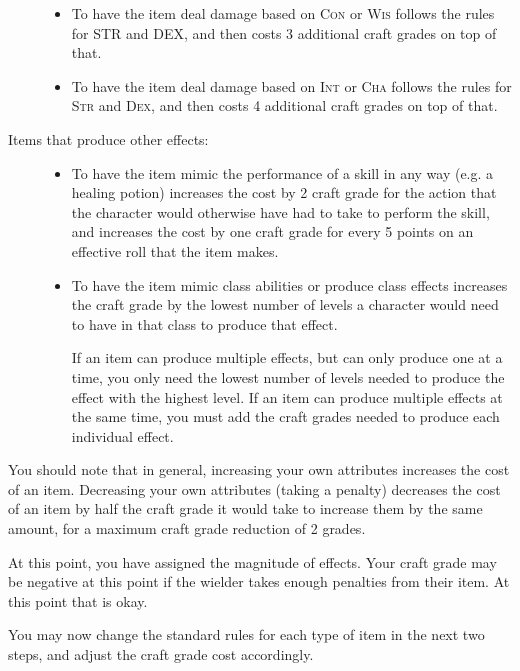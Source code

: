 \begin{description}
\begin{itemize}
		\item To have the item deal damage based on \textsc{Con} or \textsc{Wis} follows the rules for STR and DEX, and then costs 3 additional craft grades on top of that.
		
		\item To have the item deal damage based on \textsc{Int} or \textsc{Cha} follows the rules for \textsc{Str} and \textsc{Dex}, and then costs 4 additional craft grades on top of that.
	\end{itemize}
	\item[Items that produce other effects:] \hfill
	\begin{itemize}
		\item To have the item mimic the performance of a skill in any way (e.g. a healing potion) increases the cost by 2 craft grade for the action that the character would otherwise have had to take to perform the skill, and increases the cost by one craft grade for every 5 points on an effective roll that the item makes.
		
		\item To have the item mimic class abilities or produce class effects increases the craft grade by the lowest number of levels a character would need to have in that class to produce that effect.
	
		If an item can produce multiple effects, but can only produce one at a time, you only need the lowest number of levels needed to produce the effect with the highest level. If an item can produce multiple effects at the same time, you must add the craft grades needed to produce each individual effect.
	\end{itemize}
\end{description}

You should note that in general, increasing your own attributes increases the cost of an item. Decreasing your own attributes (taking a penalty) decreases the cost of an item by half the craft grade it would take to increase them by the same amount, for a maximum craft grade reduction of 2 grades.

At this point, you have assigned the magnitude of effects. Your craft grade may be negative at this point if the wielder takes enough penalties from their item. At this point that is okay.

You may now change the standard rules for each type of item in the next two steps, and adjust the craft grade cost accordingly.

